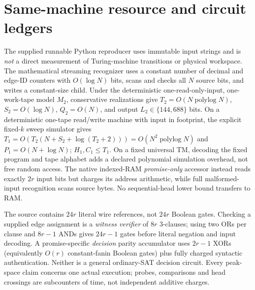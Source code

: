 \documentclass[11pt]{article}
\begin{document}
\section{Same-machine resource and circuit ledgers}
The supplied runnable Python reproducer uses immutable input strings and is \emph{not} a direct measurement of Turing-machine transitions or physical workspace. The mathematical streaming recognizer uses a constant number of decimal and edge-ID counters with $O(\log N)$ bits, scans and checks all $N$ source bits, and writes a constant-size child. Under the deterministic one-read-only-input, one-work-tape model $M_2$, conservative realizations give $T_2=O(N\operatorname{polylog}N)$, $S_2=O(\log N)$, $Q_2=O(N)$, and output $L_2\in\{144,688\}$ bits. On a deterministic one-tape read/write machine with input in footprint, the explicit fixed-$k$ sweep simulator gives $T_1=O(T_2(N+S_2+\log(T_2+2)))=O(N^2\operatorname{polylog}N)$ and $P_1=O(N+\log N)$; $H_1,C_1\le T_1$. On a fixed universal TM, decoding the fixed program and tape alphabet adds a declared polynomial simulation overhead, not free random access. The native indexed-RAM \emph{promise-only} accessor instead reads exactly $2r$ input bits but charges its address arithmetic, while full malformed-input recognition scans source bytes. No sequential-head lower bound transfers to RAM.

The source contains $24r$ literal wire references, not $24r$ Boolean gates. Checking a supplied edge assignment is a \emph{witness verifier} of $8r$ 3-clauses; using two ORs per clause and $8r-1$ ANDs gives $24r-1$ gates before literal negation and input decoding. A promise-specific \emph{decision} parity accumulator uses $2r-1$ XORs (equivalently $O(r)$ constant-fanin Boolean gates) plus fully charged syntactic authentication. Neither is a general ordinary-SAT decision circuit. Every peak-space claim concerns one actual execution; probes, comparisons and head crossings are subcounters of time, not independent additive charges.
\end{document}
